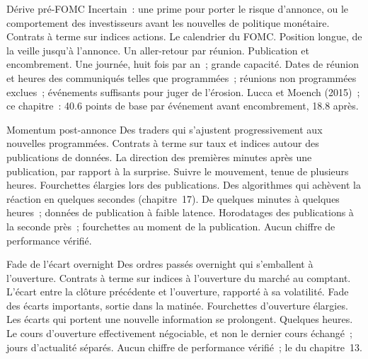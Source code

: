 \begin{strategyfile}{Dérive pré-FOMC}\label{strat:s1:short-term-futures-strategies:prefomc}
 Incertain~: une prime pour porter le risque d'annonce, ou le comportement des investisseurs avant les nouvelles de politique monétaire.
 Contrats à terme sur indices actions.
 Le calendrier du FOMC.
 Position longue, de la veille jusqu'à l'annonce.
 Un aller-retour par réunion.
 Publication et encombrement.
 Une journée, huit fois par an~; grande capacité.
 Dates de réunion et heures des communiqués telles que programmées~; réunions non programmées exclues~; événements suffisants pour juger de l'érosion.
 Lucca et Moench (2015)~; ce chapitre~: 40.6 points de base par événement avant encombrement, 18.8 après.
\end{strategyfile}

\begin{strategyfile}{Momentum post-annonce}\label{strat:s1:short-term-futures-strategies:post}
 Des traders qui s'ajustent progressivement aux nouvelles programmées.
 Contrats à terme sur taux et indices autour des publications de données.
 La direction des premières minutes après une publication, par rapport à la surprise.
 Suivre le mouvement, tenue de plusieurs heures.
 Fourchettes élargies lors des publications.
 Des algorithmes qui achèvent la réaction en quelques secondes (chapitre~17).
 De quelques minutes à quelques heures~; données de publication à faible latence.
 Horodatages des publications à la seconde près~; fourchettes au moment de la publication.
 Aucun chiffre de performance vérifié.
\end{strategyfile}

\begin{strategyfile}{Fade de l'écart overnight}\label{strat:s1:short-term-futures-strategies:gap}
 Des ordres passés overnight qui s'emballent à l'ouverture.
 Contrats à terme sur indices à l'ouverture du marché au comptant.
 L'écart entre la clôture précédente et l'ouverture, rapporté à sa volatilité.
 Fade des écarts importants, sortie dans la matinée.
 Fourchettes d'ouverture élargies.
 Les écarts qui portent une nouvelle information se prolongent.
 Quelques heures.
 Le cours d'ouverture effectivement négociable, et non le dernier cours échangé~; jours d'actualité séparés.
 Aucun chiffre de performance vérifié~; le  du chapitre~13.
\end{strategyfile}

